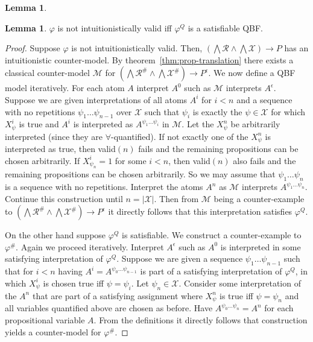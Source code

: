 \documentclass{easychair}
\theoremstyle{definition}
\theoremstyle{definition}
\theoremstyle{definition}
\newtheorem{lemma}[theorem]{Lemma}
\theoremstyle{definition}
\theoremstyle{definition}
\theoremstyle{definition}
\theoremstyle{definition}
\begin{document}
\begin{lemma}
\begin{lemma}\label{lemma:QBF}
	$\varphi$ is not intuitionistically valid iff $\varphi^Q$ is a satisfiable QBF.
\end{lemma}
\begin{proof}
Suppose $\varphi$ is not intuitionistically valid.
Then, $(\bigwedge\mathcal R\wedge\bigwedge\mathcal X)\to P$ has an intuitionistic counter-model. By theorem~\ref{thm:prop-translation} there exists a classical counter-model $\mathcal M$ for $(\bigwedge\mathcal R^\#\wedge\bigwedge\mathcal X^\#)\to P^\epsilon$.
We now define a QBF model iteratively.
For each atom $A$ interpret $A^0$ such as $\mathcal M$ interprets $A^\epsilon$. Suppose we are given interpretations of all atoms $A^i$ for $i < n$ and a sequence with no repetitions $\psi_1\dots\psi_{n-1}$ over $\mathcal X$ such that $\psi_i$ is exactly the $\psi\in\mathcal X$ for which $X_{\psi}^i$ is true and $A^i$ is interpreted as $A^{\psi_1\dots\psi_i}$  in $\mathcal M$.
Let the $X^{n}_\psi$ be arbitrarily interpreted (since they are $\forall$-quantified). If not exactly one of the $X^{n}_\psi$ is interpreted as true, then valid$(n)$ fails and the remaining propositions can be chosen arbitrarily. If $X^i_{\psi_n} = 1$ for some $i < n$, then valid$(n)$ also fails and the remaining propositions can be chosen arbitrarily.
So we may assume that $\psi_1\dots\psi_n$ is a sequence with no repetitions.
Interpret the atoms $A^n$ as $\mathcal M$ interprets $A^{\psi_1\dots\psi_n}$.
Continue this construction until $n  = |\mathcal X|$. Then from $\mathcal M$ being a counter-example to $(\bigwedge\mathcal R^\#\wedge\bigwedge\mathcal X^\#)\to P^\epsilon$ it directly follows that this interpretation satisfies $\varphi^Q$.
	
On the other hand suppose $\varphi^Q$ is satisfiable. We construct a counter-example to $\varphi^\#$.
Again we proceed iteratively. Interpret $A^\epsilon$ such as $A^0$ is interpreted in some satisfying interpretation of $\varphi^Q$. Suppose we are given a sequence $\psi_1\dots \psi_{n-1}$ such that for $i<n$ having $A^i = A^{\psi_0\dots\psi_{n-1}}$ is part of a satisfying interpretation of $\varphi^Q$, in which $X^i_\psi$ is chosen true iff $\psi = \psi_i$. Let $\psi_n\in\mathcal X$. Consider some interpretation of the $A^n$ that are part of a satisfying assignment where $X^n_\psi$ is true iff $\psi = \psi_n$ and all variables quantified above are chosen as before. Have $A^{\psi_0\dots\psi_n} = A^n$ for each propositional variable $A$. From the definitions it directly follows that construction yields a counter-model for $\varphi^\#$.
\end{proof}




\end{lemma}
\end{document}
